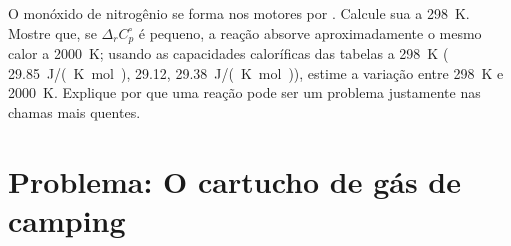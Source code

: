 \begin{exercise}[$\star\star\star$]\label{exo:b2:reaction-enthalpy:12}
O monóxido de nitrogênio se forma nos motores por .
Calcule sua  a \qty{298}{K}. Mostre que, se
$\Delta_r C_p^\circ$ é pequeno, a reação absorve aproximadamente o mesmo
calor a \qty{2000}{K}; usando as capacidades caloríficas das tabelas a
\qty{298}{K} ( \qty{29.85}{J/(K.mol)},  29.12, 
\qty{29.38}{J/(K.mol)}), estime a variação entre
\qty{298}{K} e \qty{2000}{K}. Explique por que uma reação  pode
ser um problema justamente nas chamas mais quentes.
\end{exercise}

\section{Problema: O cartucho de gás de camping}

